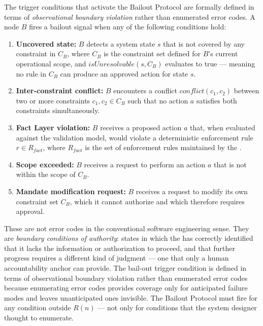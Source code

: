 The trigger conditions that activate the Bailout Protocol are formally defined in terms of \textit{observational boundary violation} rather than enumerated error codes. A \bounds{} node $B$ fires a bailout signal when any of the following conditions hold:

\begin{enumerate}
\item \textbf{Uncovered state:} $B$ detects a system state $s$ that is not covered by any constraint in $C_B$, where $C_B$ is the constraint set defined for $B$'s current operational scope, and $isUnresolvable(s, C_B)$ evaluates to true — meaning no rule in $C_B$ can produce an approved action for state $s$.
\item \textbf{Inter-constraint conflict:} $B$ encounters a conflict $conflict(c_1, c_2)$ between two or more constraints $c_1, c_2 \in C_B$ such that no action $a$ satisfies both constraints simultaneously.
\item \textbf{Fact Layer violation:} $B$ receives a proposed action $a$ that, when evaluated against the \fact{} validation model, would violate a deterministic enforcement rule $r \in R_{fact}$, where $R_{fact}$ is the set of enforcement rules maintained by the \fact{}.
\item \textbf{Scope exceeded:} $B$ receives a request to perform an action $a$ that is not within the scope of $C_B$.
\item \textbf{Mandate modification request:} $B$ receives a request to modify its own constraint set $C_B$, which it cannot authorize and which therefore requires \purpose{} approval.
\end{enumerate}

These are not error codes in the conventional software engineering sense. They are \textit{boundary conditions of authority}: states in which the \bounds{} has correctly identified that it lacks the information or authorization to proceed, and that further progress requires a different kind of judgment — one that only a human accountability anchor can provide. The bail-out trigger condition is defined in terms of observational boundary violation rather than enumerated error codes because enumerating error codes provides coverage only for anticipated failure modes and leaves unanticipated ones invisible. The Bailout Protocol must fire for any condition outside $R(n)$ — not only for conditions that the system designer thought to enumerate.


